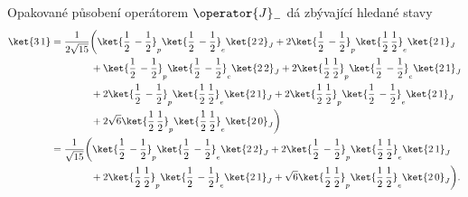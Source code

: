 \begin{solution}
\begin{enumerate}
		Opakované působení operátorem $\operator{J}_{-}$ dá zbývající hledané stavy
		\begin{align}
			\ket{3\,1}
				&=\frac{1}{2\sqrt{15}}\bigg(
					\ket{\frac{1}{2}\,-\frac{1}{2}}_{p}\ket{\frac{1}{2}\,-\frac{1}{2}}_{e}\ket{2\,2}_{J}
					+2\ket{\frac{1}{2}\,-\frac{1}{2}}_{p}\ket{\frac{1}{2}\,\frac{1}{2}}_{e}\ket{2\,1}_{J}\nonumber\\
				&\qquad\qquad+\ket{\frac{1}{2}\,-\frac{1}{2}}_{p}\ket{\frac{1}{2}\,-\frac{1}{2}}_{e}\ket{2\,2}_{J}
					+2\ket{\frac{1}{2}\,\frac{1}{2}}_{p}\ket{\frac{1}{2}\,-\frac{1}{2}}_{e}\ket{2\,1}_{J}\nonumber\\
				&\qquad\qquad+2\ket{\frac{1}{2}\,-\frac{1}{2}}_{p}\ket{\frac{1}{2}\,\frac{1}{2}}_{e}\ket{2\,1}_{J}
					+2\ket{\frac{1}{2}\,\frac{1}{2}}_{p}\ket{\frac{1}{2}\,-\frac{1}{2}}_{e}\ket{2\,1}_{J}\nonumber\\
				&\qquad\qquad+2\sqrt{6}\ket{\frac{1}{2}\,\frac{1}{2}}_{p}\ket{\frac{1}{2}\,\frac{1}{2}}_{e}\ket{2\,0}_{J}\bigg)\nonumber\\
				&=\frac{1}{\sqrt{15}}\bigg(
					\ket{\frac{1}{2}\,-\frac{1}{2}}_{p}\ket{\frac{1}{2}\,-\frac{1}{2}}_{e}\ket{2\,2}_{J}
					+2\ket{\frac{1}{2}\,-\frac{1}{2}}_{p}\ket{\frac{1}{2}\,\frac{1}{2}}_{e}\ket{2\,1}_{J}\nonumber\\
				&\qquad\qquad+2\ket{\frac{1}{2}\,\frac{1}{2}}_{p}\ket{\frac{1}{2}\,-\frac{1}{2}}_{e}\ket{2\,1}_{J}
					+\sqrt{6}\ket{\frac{1}{2}\,\frac{1}{2}}_{p}\ket{\frac{1}{2}\,\frac{1}{2}}_{e}\ket{2\,0}_{J}\bigg).					
		\end{align}				
				

\end{enumerate}
\end{solution}
